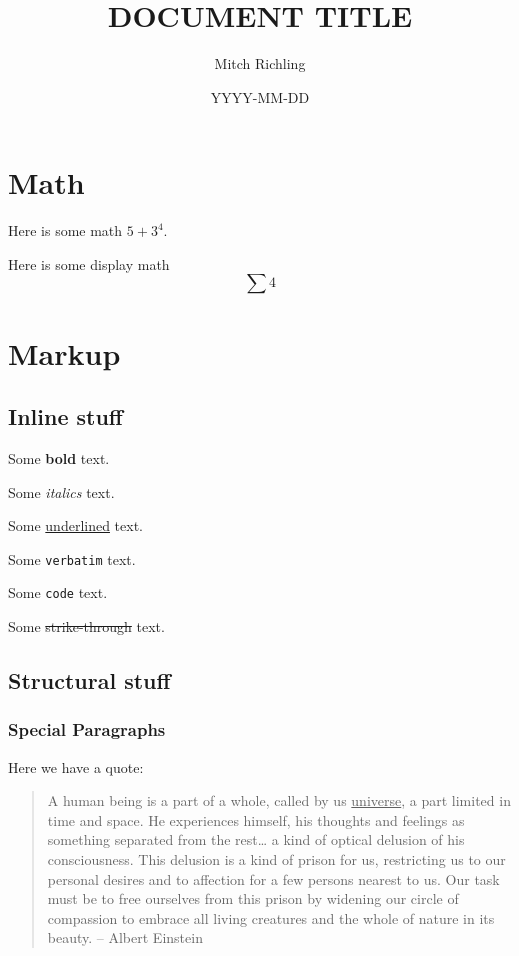 \documentclass[11pt]{article}
\author{Mitch Richling}
\date{YYYY-MM-DD}
\title{DOCUMENT TITLE}
\begin{document}
\maketitle
\tableofcontents


\section{Math}
\label{sec-1}

Here is some math $5+3^4$.

Here is some display math $$\sum 4$$

\section{Markup}
\label{sec-2}

\subsection{Inline stuff}
\label{sec-2-1}

Some \textbf{bold} text.

Some \emph{italics} text.

Some \uline{underlined} text.

Some \texttt{verbatim} text.

Some \verb~code~ text.

Some \sout{strike-through} text.

\subsection{Structural stuff}
\label{sec-2-2}

\subsubsection{Special Paragraphs}
\label{sec-2-2-1}

Here we have a quote:
\begin{quote}
A human being is a part of a whole, called by us \uline{universe}, a part limited in time and space. He experiences himself, his thoughts and feelings as something
separated from the rest\ldots{} a kind of optical delusion of his consciousness. This delusion is a kind of prison for us, restricting us to our personal desires
and to affection for a few persons nearest to us. Our task must be to free ourselves from this prison by widening our circle of compassion to embrace all
living creatures and the whole of nature in its beauty. -- Albert Einstein
\end{quote}
\end{document}
